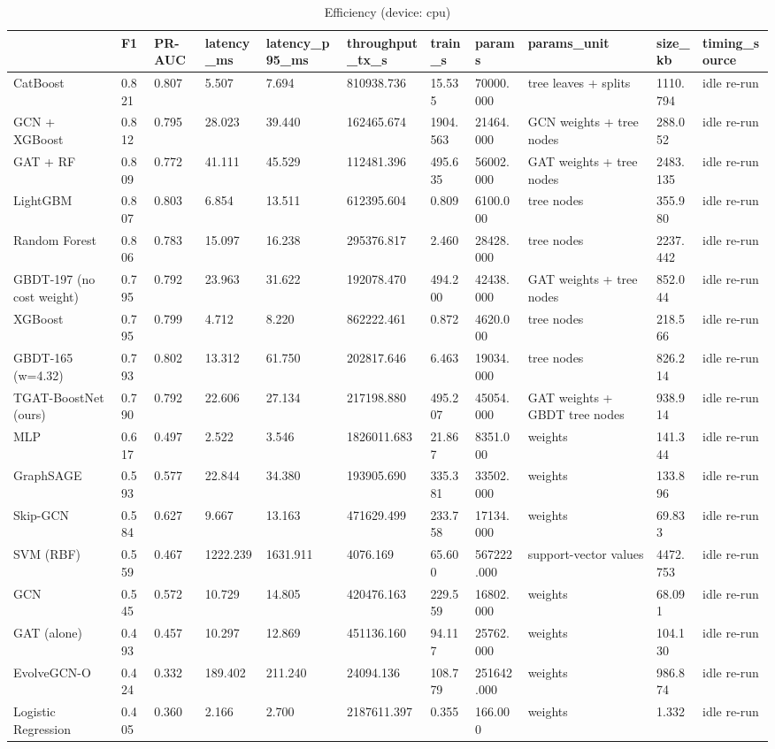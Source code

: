 \begin{table}
\caption{Efficiency (device: cpu)}
\label{tab:03_efficiency}
\begin{tabular}{lllllllllll}
\toprule
 & F1 & PR-AUC & latency\_ms & latency\_p95\_ms & throughput\_tx\_s & train\_s & params & params\_unit & size\_kb & timing\_source \\
\midrule
CatBoost & 0.821 & 0.807 & 5.507 & 7.694 & 810938.736 & 15.535 & 70000.000 & tree leaves + splits & 1110.794 & idle re-run \\
GCN + XGBoost & 0.812 & 0.795 & 28.023 & 39.440 & 162465.674 & 1904.563 & 21464.000 & GCN weights + tree nodes & 288.052 & idle re-run \\
GAT + RF & 0.809 & 0.772 & 41.111 & 45.529 & 112481.396 & 495.635 & 56002.000 & GAT weights + tree nodes & 2483.135 & idle re-run \\
LightGBM & 0.807 & 0.803 & 6.854 & 13.511 & 612395.604 & 0.809 & 6100.000 & tree nodes & 355.980 & idle re-run \\
Random Forest & 0.806 & 0.783 & 15.097 & 16.238 & 295376.817 & 2.460 & 28428.000 & tree nodes & 2237.442 & idle re-run \\
GBDT-197 (no cost weight) & 0.795 & 0.792 & 23.963 & 31.622 & 192078.470 & 494.200 & 42438.000 & GAT weights + tree nodes & 852.044 & idle re-run \\
XGBoost & 0.795 & 0.799 & 4.712 & 8.220 & 862222.461 & 0.872 & 4620.000 & tree nodes & 218.566 & idle re-run \\
GBDT-165 (w=4.32) & 0.793 & 0.802 & 13.312 & 61.750 & 202817.646 & 6.463 & 19034.000 & tree nodes & 826.214 & idle re-run \\
TGAT-BoostNet (ours) & 0.790 & 0.792 & 22.606 & 27.134 & 217198.880 & 495.207 & 45054.000 & GAT weights + GBDT tree nodes & 938.914 & idle re-run \\
MLP & 0.617 & 0.497 & 2.522 & 3.546 & 1826011.683 & 21.867 & 8351.000 & weights & 141.344 & idle re-run \\
GraphSAGE & 0.593 & 0.577 & 22.844 & 34.380 & 193905.690 & 335.381 & 33502.000 & weights & 133.896 & idle re-run \\
Skip-GCN & 0.584 & 0.627 & 9.667 & 13.163 & 471629.499 & 233.758 & 17134.000 & weights & 69.833 & idle re-run \\
SVM (RBF) & 0.559 & 0.467 & 1222.239 & 1631.911 & 4076.169 & 65.600 & 567222.000 & support-vector values & 4472.753 & idle re-run \\
GCN & 0.545 & 0.572 & 10.729 & 14.805 & 420476.163 & 229.559 & 16802.000 & weights & 68.091 & idle re-run \\
GAT (alone) & 0.493 & 0.457 & 10.297 & 12.869 & 451136.160 & 94.117 & 25762.000 & weights & 104.130 & idle re-run \\
EvolveGCN-O & 0.424 & 0.332 & 189.402 & 211.240 & 24094.136 & 108.779 & 251642.000 & weights & 986.874 & idle re-run \\
Logistic Regression & 0.405 & 0.360 & 2.166 & 2.700 & 2187611.397 & 0.355 & 166.000 & weights & 1.332 & idle re-run \\
\bottomrule
\end{tabular}
\end{table}
